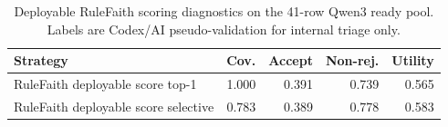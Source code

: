 \begin{table}[t]
\centering
\small
\begin{tabular}{lrrrr}
\toprule
Strategy & Cov. & Accept & Non-rej. & Utility \\
\midrule
RuleFaith deployable score top-1 & 1.000 & 0.391 & 0.739 & 0.565 \\
RuleFaith deployable score selective & 0.783 & 0.389 & 0.778 & 0.583 \\
\bottomrule
\end{tabular}
\caption{Deployable RuleFaith scoring diagnostics on the 41-row Qwen3 ready pool. Labels are Codex/AI pseudo-validation for internal triage only.}
\label{tab:rulefaith-ready-deployable-selector}
\end{table}
